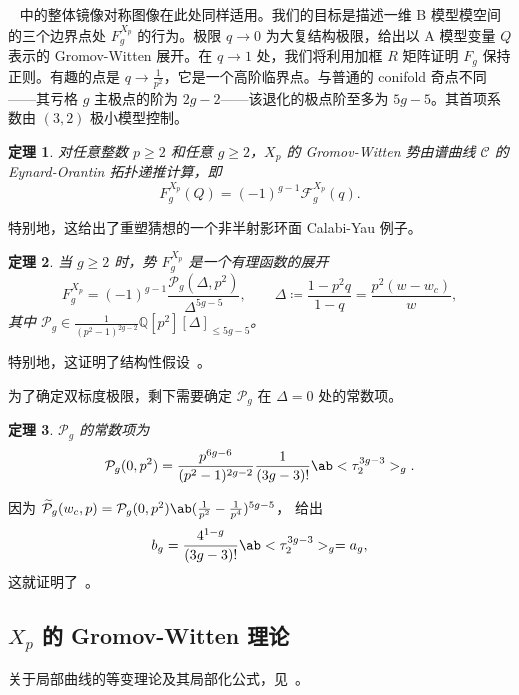 \documentclass{amsart}
\newtheorem{thm}{定理}[section]
\theoremstyle{definition}
\theoremstyle{remark}
\theoremstyle{plain}
\theoremstyle{definition}
\theoremstyle{remark}
\newcommand{\Q}{\mathbb{Q}}
\newcommand{\mc}[1]{\mathcal{#1}}
\newcommand{\wt}[1]{\widetilde{#1}}
\newcommand{\1}{\mathbf{1}}
\newcommand{\2}{\mathbf{2}}
\newcommand{\3}{\mathbf{3}}
\begin{document}
~ 中的整体镜像对称图像在此处同样适用。我们的目标是描述一维 B 模型模空间的三个边界点处 \(F_g^{X_p}\) 的行为。极限 \(q \to 0\) 为大复结构极限，给出以 A 模型变量 \(Q\) 表示的 Gromov-Witten 展开。在 \(q \to 1\) 处，我们将利用加框 \(R\) 矩阵证明 \(F_g\) 保持正则。有趣的点是 \(q \to \frac{1}{p^2}\)，它是一个高阶临界点。与普通的 conifold 奇点不同——其亏格 \(g\) 主极点的阶为 \(2g-2\)——该退化的极点阶至多为 \(5g-5\)。其首项系数由 \((3,2)\) 极小模型控制。

\begin{thm}%
\label{thm:local P1 mirror symmetry}
    对任意整数 \(p \geq 2\) 和任意 \(g \geq 2\)，\(X_p\) 的 Gromov-Witten 势由谱曲线 \(\mc{C}\) 的 Eynard-Orantin 拓扑递推计算，即
    \[ F_g^{X_p}(Q) = (-1)^{g-1}\mc{F}_g^{X_p}(q). \]
\end{thm}

特别地，这给出了重塑猜想的一个非半射影环面 Calabi-Yau 例子。

\begin{thm}%
\label{thm:local P1 rationality}
    当 \(g \geq 2\) 时，势 \(F_g^{X_p}\) 是一个有理函数的展开
    \[ F_g^{X_p} = (-1)^{g-1}\frac{\mc{P}_g(\Delta,p^2)}{\Delta^{5g-5}}, \qquad \Delta \coloneqq \frac{1-p^2q}{1-q} = \frac{p^2(w-w_c)}{w}, \]
    其中 \(\mc{P}_g \in \frac{1}{(p^2-1)^{2g-2}}\Q[p^2][\Delta]_{\leq 5g-5}\)。
\end{thm}

特别地，这证明了结构性假设~。

为了确定双标度极限，剩下需要确定 \(\mc{P}_g\) 在 \(\Delta = 0\) 处的常数项。

\begin{thm}%
\label{thm:local P1 constant term}
    \(\mc{P}_g\) 的常数项为
    \[ \mc{P}_g(0,p^2) = \frac{p^{6g-6}}{(p^2-1)^{2g-2}}\frac{1}{(3g-3)!}\ab<\tau_2^{3g-3}>_g. \]
\end{thm}

因为 \(\wt{\mc{P}}_g(w_c,p) = \mc{P}_g(0,p^2)\ab(\frac{1}{p^2}-\frac{1}{p^4})^{5g-5}\)， 给出
\[ b_g = \frac{4^{1-g}}{(3g-3)!}\ab<\tau_2^{3g-3}>_g = a_g, \]
这就证明了~。

\subsection{\(X_p\) 的 Gromov-Witten 理论}%
\label{sub:Gromov-Witten theory of Xp}

关于局部曲线的等变理论及其局部化公式，见~\cite{BryanPandharipande2008}。
\end{document}
